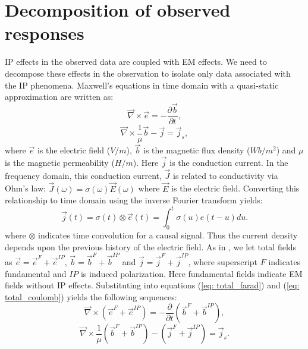 \documentclass[a4paper, 11pt]{article}
\newcommand{\curl}{{\vec \nabla}\times}
\newcommand {\J}{{\vec J}}
\newcommand {\E}{{\vec E}}
\renewcommand {\j}  { {\vec j} }
\renewcommand {\b}  { {\vec b} }
\newcommand {\e}  { {\vec e} }
\begin{document}

\section{Decomposition of observed responses}
IP effects in the observed data are coupled with EM effects. We need to decompose these effects in the observation to isolate only data associated with the IP phenomena.  
Maxwell's equations in time domain with a quasi-static approximation are written as:
\begin{equation}
  \curl{\e} = -\frac{\partial \b}{\partial t},
  \label{eq: total_farad}
\end{equation}
\begin{equation}
  \curl{\frac{1}{\mu}\b} - \j= \j_{s},
  \label{eq: total_coulomb}
\end{equation}
where $\e$ is the electric field ($V/m$), $\b$ is the magnetic flux density ($Wb/m^2$) and $\mu$ is the magnetic permeability ($H/m$). Here $\j$ is the conduction current. In the frequency domain, this conduction current, $\J$ is related to conductivity via Ohm’s law: $\J(\omega) = \sigma(\omega)\E(\omega)$ where $\E$ is the electric field. 
Converting this relationship to time domain using the inverse Fourier transform yields:
\begin{equation}
  \j(t) = \sigma(t)\otimes \e(t) = \int_0^t \sigma(u) e(t-u) du.
  \label{eq: ohms_law_convolution}
\end{equation}
where $\otimes$ indicates time convolution for a causal signal.  
Thus the current density depends upon the previous history of the electric field.
As in \cite{Smith1988a}, we let total fields as $\e = \e^{F} + \e^{IP}$, $\b = \b^{F} + \b^{IP}$ and $\j = \j^{F} + \j^{IP}$, where superscript $F$ indicates fundamental and $IP$ is induced polarization. 
Here fundamental fields indicate EM fields without IP effects. 
Substituting into equations (\ref{eq: total_farad}) and (\ref{eq: total_coulomb}) yields the following sequences:
\begin{equation}
  \curl({\e^{F}+\e^{IP}}) = -\frac{\partial}{\partial t} (\b^{F}+\b^{IP}),
\end{equation}
\begin{equation}
  \curl\frac{1}{\mu}(\b^{F}+\b^{IP}) - (\j^{F}+\j^{IP})= \j_{s}.
\end{equation}
\end{document}
